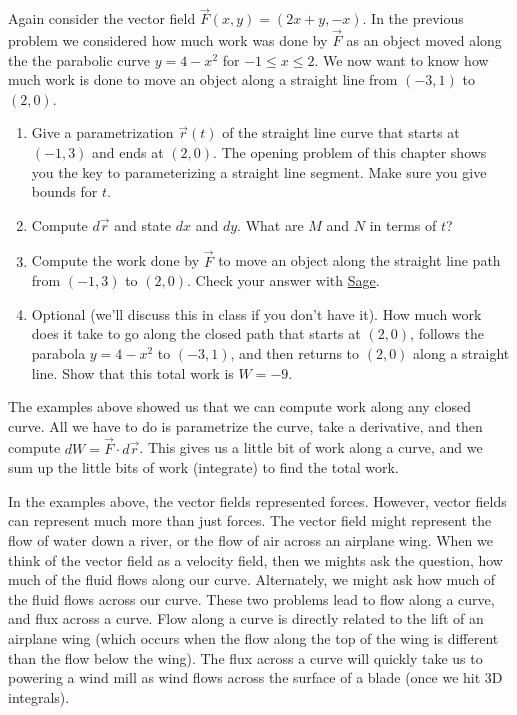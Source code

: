\begin{problem}
 Again consider the vector field $\vec F(x,y) = (2x+y,-x)$. In the previous problem we considered how much work was done by $\vec F$ as an object moved along the the parabolic curve $y=4-x^2$ for $-1\leq x\leq 2$. We now want to know how much work is done to move an object along a straight line from $(-3,1)$ to $(2,0)$.    
\begin{enumerate}
 \item Give a parametrization $\vec r(t)$ of the straight line curve that starts at $(-1,3)$ and ends at $(2,0)$. The opening problem of this chapter shows you the key to parameterizing a straight line segment.  Make sure you give bounds for $t$. 
 \item Compute $d\vec r$ and state $dx$ and $dy$. What are $M$ and $N$ in terms of $t$?
 \item Compute the work done by $\vec F$ to move an object along the straight line path from $(-1,3)$ to $(2,0)$. Check your answer with \href{\sageworkurl}{Sage}. 
 \item Optional (we'll discuss this in class if you don't have it).  How much work does it take to go along the closed path that starts at $(2,0)$, follows the parabola $y=4-x^2$ to $(-3,1)$, and then returns to $(2,0)$ along a straight line. Show that this total work is $W=-9$.   
\end{enumerate}
\end{problem}


The examples above showed us that we can compute work along any closed curve.  All we have to do is parametrize the curve, take a derivative, and then compute $dW = \vec F \cdot d\vec r$. This gives us a little bit of work along a curve, and we sum up the little bits of work (integrate) to find the total work. 

In the examples above, the vector fields represented forces. However, vector fields can represent much more than just forces. The vector field might represent the flow of water down a river, or the flow of air across an airplane wing.  When we think of the vector field as a velocity field, then we mights ask the question, how much of the fluid flows along our curve. Alternately, we might ask how much of the fluid flows across our curve.  These two problems lead to flow along a curve, and flux across a curve. Flow along a curve is directly related to the lift of an airplane wing (which occurs when the flow along the top of the wing is different than the flow below the wing).  The flux across a curve will quickly take us to powering a wind mill as wind flows across the surface of a blade (once we hit 3D integrals).


